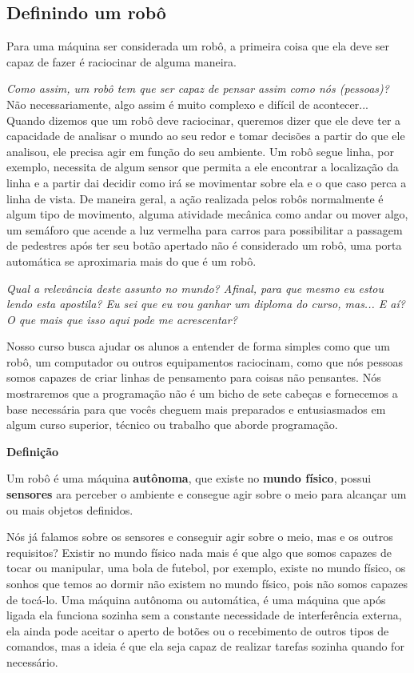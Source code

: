 \documentclass[conference]{IEEEtran}
\begin{document}
\begin{center}
\subsection{Definindo um robô}    
\end{center}
\par
    Para uma máquina ser considerada um robô, a primeira coisa que ela deve ser capaz de fazer é raciocinar de alguma maneira.
    \par
    \textit{Como assim, um robô tem que ser capaz de pensar assim como nós (pessoas)?}
    Não necessariamente, algo assim é muito complexo e difícil de acontecer... Quando dizemos que um robô deve raciocinar, queremos dizer que ele deve ter a capacidade de analisar o mundo ao seu redor e tomar decisões a partir do que ele analisou, ele precisa agir em função do seu ambiente. Um robô segue linha, por exemplo, necessita de algum sensor que permita a ele encontrar a localização da linha e a partir dai decidir como irá se movimentar sobre ela e o que caso perca a linha de vista. De maneira geral, a ação realizada pelos robôs normalmente é algum tipo de movimento, alguma atividade mecânica como andar ou mover algo, um semáforo que acende a luz vermelha para carros para possibilitar a passagem de pedestres após ter seu botão apertado não é considerado um robô, uma porta automática se aproximaria mais do que é um robô.
    \par
    \textit{Qual a relevância deste assunto no mundo? Afinal, para que mesmo eu estou lendo esta apostila? Eu sei que eu vou ganhar um diploma do curso, mas... E aí? O que mais que isso aqui pode me acrescentar?}
    \par
    Nosso curso busca ajudar os alunos a entender de forma simples como que um robô, um computador ou outros equipamentos raciocinam, como que nós pessoas somos capazes de criar linhas de pensamento para coisas não pensantes. Nós mostraremos que a programação não é um bicho de sete cabeças e fornecemos a base necessária para que vocês cheguem mais preparados e entusiasmados em algum curso superior, técnico ou trabalho que aborde programação.
    \\
    \begin{center}
    \textbf{Definição}                
    \end{center}
    \par
    Um robô é uma máquina \textbf{autônoma}, que existe no \textbf{mundo físico}, possui \textbf{sensores} ara perceber o ambiente e consegue agir sobre o meio para alcançar um ou mais objetos definidos.
    \par
    Nós já falamos sobre os sensores e conseguir agir sobre o meio, mas e os outros requisitos? Existir no mundo físico nada mais é que algo que somos capazes de tocar ou manipular, uma bola de futebol, por exemplo, existe no mundo físico, os sonhos que temos ao dormir não existem no mundo físico, pois não somos capazes de tocá-lo. Uma máquina autônoma ou automática, é uma máquina que após ligada ela funciona sozinha sem a constante necessidade de interferência externa, ela ainda pode aceitar o aperto de botões ou o recebimento de outros tipos de comandos, mas a ideia é que ela seja capaz de realizar tarefas sozinha quando for necessário.
\end{document}
